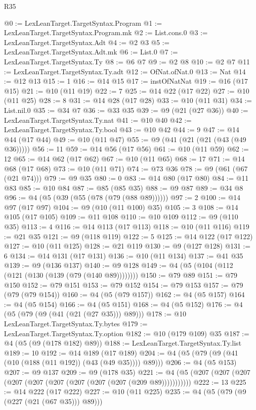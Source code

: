 \begin{lexlean}{R35}
\begin{coremodule}
@0 := LexLeanTarget.TargetSyntax.Program
@1 := LexLeanTarget.TargetSyntax.Program.mk
@2 := List.cons.{0}
@3 := LexLeanTarget.TargetSyntax.Adt
@4 := @2 @3
@5 := LexLeanTarget.TargetSyntax.Adt.mk
@6 := List.{0}
@7 := LexLeanTarget.TargetSyntax.Ty
@8 := @6 @7
@9 := @2 @8
@10 := @2 @7
@11 := LexLeanTarget.TargetSyntax.Ty.adt
@12 := OfNat.ofNat.{0}
@13 := Nat
@14 := @12 @13
@15 := 1
@16 := @14 @15
@17 := instOfNatNat
@19 := @16 (@17 @15)
@21 := @10 (@11 @19)
@22 := 7
@25 := @14 @22 (@17 @22)
@27 := @10 (@11 @25)
@28 := 8
@31 := @14 @28 (@17 @28)
@33 := @10 (@11 @31)
@34 := List.nil.{0}
@35 := @34 @7
@36 := @33 @35
@39 := @9 (@21 (@27 @36))
@40 := LexLeanTarget.TargetSyntax.Ty.nat
@41 := @10 @40
@42 := LexLeanTarget.TargetSyntax.Ty.bool
@43 := @10 @42
@44 := 9
@47 := @14 @44 (@17 @44)
@49 := @10 (@11 @47)
@55 := @9 (@41 (@21 (@21 (@43 (@49 @36)))))
@56 := 11
@59 := @14 @56 (@17 @56)
@61 := @10 (@11 @59)
@62 := 12
@65 := @14 @62 (@17 @62)
@67 := @10 (@11 @65)
@68 := 17
@71 := @14 @68 (@17 @68)
@73 := @10 (@11 @71)
@74 := @73 @36
@78 := @9 (@61 (@67 (@21 @74)))
@79 := @9 @35
@80 := 0
@83 := @14 @80 (@17 @80)
@84 := @11 @83
@85 := @10 @84
@87 := @85 (@85 @35)
@88 := @9 @87
@89 := @34 @8
@96 := @4 (@5 (@39 (@55 (@78 (@79 (@88 @89))))))
@97 := 2
@100 := @14 @97 (@17 @97)
@104 := @9 (@10 (@11 @100) @35)
@105 := 3
@108 := @14 @105 (@17 @105)
@109 := @11 @108
@110 := @10 @109
@112 := @9 (@110 @35)
@113 := 4
@116 := @14 @113 (@17 @113)
@118 := @10 (@11 @116)
@119 := @21 @35
@121 := @9 (@118 @119)
@122 := 5
@125 := @14 @122 (@17 @122)
@127 := @10 (@11 @125)
@128 := @21 @119
@130 := @9 (@127 @128)
@131 := 6
@134 := @14 @131 (@17 @131)
@136 := @10 (@11 @134)
@137 := @41 @35
@139 := @9 (@136 @137)
@140 := @9 @128
@149 := @4 (@5 (@104 (@112 (@121 (@130 (@139 (@79 (@140 @89))))))))
@150 := @79 @89
@151 := @79 @150
@152 := @79 @151
@153 := @79 @152
@154 := @79 @153
@157 := @79 (@79 (@79 @154))
@160 := @4 (@5 (@79 @157))
@162 := @4 (@5 @157)
@164 := @4 (@5 @154)
@166 := @4 (@5 @151)
@168 := @4 (@5 @152)
@176 := @4 (@5 (@79 (@9 (@41 (@21 (@27 @35))) @89)))
@178 := @10 LexLeanTarget.TargetSyntax.Ty.bytes
@179 := LexLeanTarget.TargetSyntax.Ty.option
@182 := @10 (@179 @109) @35
@187 := @4 (@5 (@9 (@178 @182) @89))
@188 := LexLeanTarget.TargetSyntax.Ty.list
@189 := 10
@192 := @14 @189 (@17 @189)
@204 := @4 (@5 (@79 (@9 (@41 (@10 (@188 (@11 @192)) (@43 (@49 @35)))) @89)))
@206 := @4 (@5 @153)
@207 := @9 @137
@209 := @9 (@178 @35)
@221 := @4 (@5 (@207 (@207 (@207 (@207 (@207 (@207 (@207 (@207 (@207 (@209 @89)))))))))))
@222 := 13
@225 := @14 @222 (@17 @222)
@227 := @10 (@11 @225)
@235 := @4 (@5 (@79 (@9 (@227 (@21 (@67 @35))) @89)))

\end{coremodule}
\end{lexlean}
